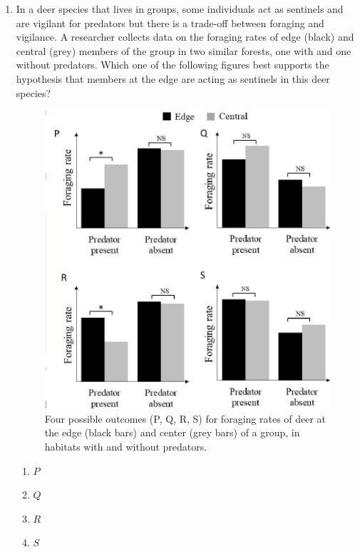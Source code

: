 \documentclass[journal]{IEEEtran}
\begin{document}
\begin{enumerate}
    \item In a deer species that lives in groups, some individuals act as sentinels and are vigilant for predators but there is a trade-off between foraging and vigilance.
A researcher collects data on the foraging rates of edge (black) and central (grey) members of the group in two similar forests, one with and one without predators.
Which one of the following figures best supports the hypothesis that members at the edge are acting as sentinels in this deer species?
\clearpage
\begin{figure}[!h]
        \centering
        \includegraphics[width=0.6\columnwidth]{figs/Q.49.png}
        \caption{Four possible outcomes (P, Q, R, S) for foraging rates of deer at the edge (black bars) and center (grey bars) of a group, in habitats with and without predators.}
        \label{fig:Q.49}
    \end{figure}
    \begin{multicols}{4}
    \begin{enumerate}
        \item $P$
        \item $Q$
        \item $R$
        \item $S$
    \end{enumerate}
    \end{multicols}
    

\end{enumerate}
\end{document}
